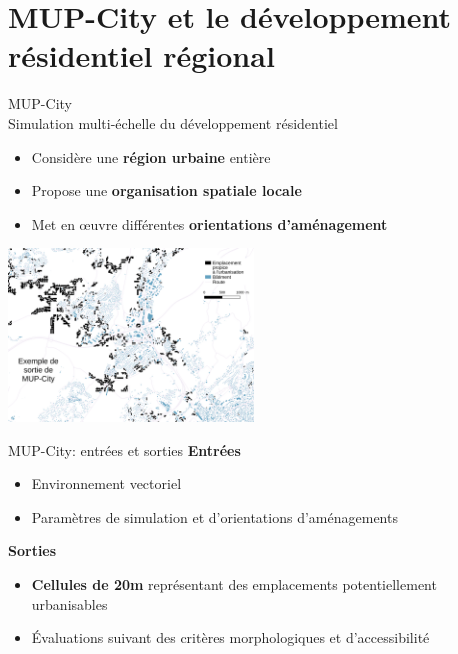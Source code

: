 \documentclass[xcolor=table]{beamer}
\begin{document}
\section[MUP-City]{MUP-City et le développement résidentiel régional}




\begin{frame}{MUP-City}
	\\
	Simulation multi-échelle du développement résidentiel 
	\begin{itemize}
		\item Considère une \textbf{région urbaine} entière
		\item Propose une \textbf{organisation spatiale locale}
		\item Met en œuvre différentes \textbf{orientations d'aménagement}
	\end{itemize}
	\includegraphics[width=6.5cm]{Images/ex-sorties-mup.png}
\end{frame}

\begin{frame}{MUP-City: entrées et sorties}
	\textbf{Entrées}
	\begin{itemize}
		\item Environnement vectoriel 
		\item Paramètres de simulation et d'orientations d'aménagements
	\end{itemize}
	\textbf{Sorties}
	\begin{itemize}
		\item \textbf{Cellules de 20m} représentant des emplacements potentiellement urbanisables
		\item Évaluations suivant des critères morphologiques et d'accessibilité
	\end{itemize}
	\begin{block}{}\end{block}
\end{frame}
\end{document}
